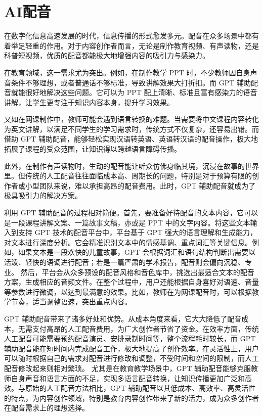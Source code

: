 \section{AI配音}\label{sec:dubbing}
在数字化信息高速发展的时代，信息传播的形式愈发多元。配音在众多场景中都有着举足轻重的作用。对于内容创作者而言，无论是制作教育视频、有声读物，还是科普短视频，优质的配音都能极大地增强内容的吸引力与感染力。

在教育领域，这一需求尤为突出。例如，在制作教学 PPT 时，不少教师因自身声音条件不够理想，或者普通话不够标准，导致讲解效果大打折扣。而 GPT 辅助配音就能很好地解决这些问题。它可以为 PPT 配上清晰、标准且富有感染力的语音讲解，让学生更专注于知识内容本身，提升学习效果。

又如在网课制作中，教师可能会遇到语言转换的难题。当需要将中文课程内容转化为英文讲解，以满足不同学生的学习需求时，传统方式不仅复杂，还容易出错。而借助 GPT 辅助配音，能够轻松实现汉语转英语、英语转汉语的配音操作，极大地拓展了课程的受众范围，让知识得以跨越语言障碍传播。

此外，在制作有声读物时，生动的配音能让听众仿佛身临其境，沉浸在故事的世界里。但传统的人工配音往往面临成本高、周期长的问题，特别是对于预算有限的创作者或小型团队来说，难以承担高昂的配音费用。此时，GPT 辅助配音就成为了极具吸引力的解决方案。


利用 GPT 辅助配音的过程相对简便。首先，要准备好待配音的文本内容，它可以是一段课程讲解文案、一篇故事文稿，亦或是 PPT 中的文字内容。将这些文本输入到支持 GPT 技术的配音平台中，平台基于 GPT 强大的语言理解和生成能力，对文本进行深度分析。它会精准识别文本中的情感基调、重点词汇等关键信息。例如，如果文本是一段欢快的儿童故事，GPT 会根据词汇和语句结构判断出需要以活泼、轻快的语调进行配音；若是一篇严肃的学术报告，配音则会偏向沉稳、专业。
然后，平台会从众多预设的配音风格和音色库中，挑选出最适合文本的配音方案，生成相应的音频文件。在整个过程中，用户还能根据自身喜好对语速、音量等参数进行微调，以达到最满意的效果。比如，教师在为网课配音时，可以根据教学节奏，适当调整语速，突出重点内容。



GPT 辅助配音带来了诸多好处和优势。从成本角度来看，它大大降低了配音成本，无需支付高昂的人工配音费用，为广大创作者节省了资金。在效率方面，传统人工配音可能需要预约配音演员、安排录制时间等，整个流程耗时较长，而 GPT 辅助配音能在短时间内完成配音工作，极大地提高了创作效率。在灵活性上，用户可以随时根据自己的需求对配音进行修改和调整，不受时间和空间的限制，而人工配音修改起来则相对繁琐。
尤其是在教育教学场景中，GPT 辅助配音能够克服教师自身声音和语言方面的不足，实现多语言配音转换，让知识传播更加广泛和高效。与原始的人工配音方法相比，GPT 辅助配音以其低成本、高效率、高灵活性的特点，为内容创作领域，特别是教育内容创作带来了新的活力，成为众多创作者在配音需求上的理想选择。

